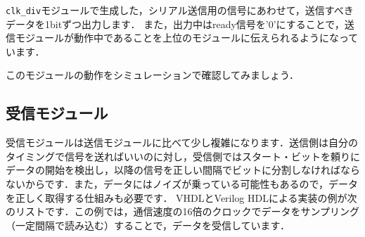\documentclass[a4paper,dvipdfmx]{jsarticle}
\begin{document}
\verb|clk_div|モジュールで生成した，シリアル送信用の信号にあわせて，送信すべきデータを1bitずつ出力します．
また，出力中はready信号を'0'にすることで，送信モジュールが動作中であることを上位のモジュールに伝えられるようになっています．

このモジュールの動作をシミュレーションで確認してみましょう．

\subsection{受信モジュール}
受信モジュールは送信モジュールに比べて少し複雑になります．送信側は自分のタイミングで信号を送ればいいのに対し，受信側ではスタート・ビットを頼りにデータの開始を検出し，以降の信号を正しい間隔でビットに分割しなければならないからです．また，データにはノイズが乗っている可能性もあるので，データを正しく取得する仕組みも必要です．
VHDLとVerilog HDLによる実装の例が次のリストです．この例では，通信速度の16倍のクロックでデータをサンプリング（一定間隔で読み込む）することで，データを受信しています．
\end{document}
